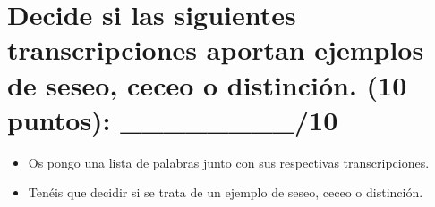 \documentclass[12pt]{exam}
\begin{document}
\vspace{.4in}

\section{Decide si las siguientes transcripciones aportan ejemplos de seseo, ceceo o distinción. (10 puntos): \_\_\_\_\_\_\_\_/10}

\begin{itemize}
	\item Os pongo una lista de palabras junto con sus respectivas transcripciones.
	\item Tenéis que decidir si se trata de un ejemplo de seseo, ceceo o distinción.
\end{itemize}
\end{document}
